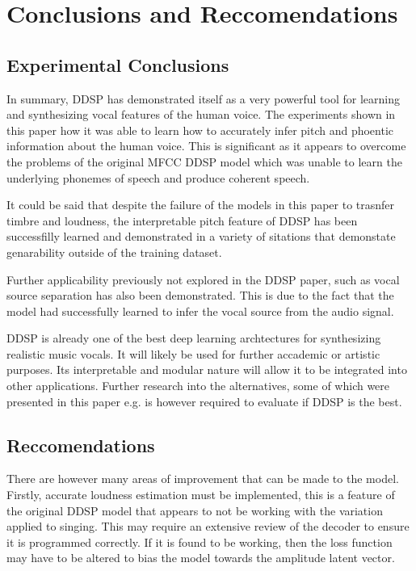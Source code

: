 \chapter{Conclusions and Reccomendations}

\section{Experimental Conclusions}

In summary, DDSP has demonstrated itself as a very powerful tool for learning and synthesizing vocal features of the human voice. The experiments shown in this paper how it was able to learn how to accurately infer pitch and phoentic information about the human voice. This is significant as it appears to overcome the problems of the original MFCC DDSP model\cite{SingingDDSP} which was unable to learn the underlying phonemes of speech and produce coherent speech.

It could be said that despite the failure of the models in this paper to trasnfer timbre and loudness, the interpretable pitch feature of DDSP has been successfilly learned and demonstrated in a variety of sitations that demonstate genarability outside of the training dataset.

Further applicability previously not explored in the DDSP paper, such as vocal source separation has also been demonstrated. This is due to the fact that the model had successfully learned to infer the vocal source from the audio signal.

DDSP is already one of the best deep learning archtectures for synthesizing realistic music vocals. It will likely be used for further accademic or artistic purposes. Its interpretable and modular nature will allow it to be integrated into other applications. Further research into the alternatives, some of which were presented in this paper e.g.  is however required to evaluate if DDSP is the best.

\section{Reccomendations}

There are however many areas of improvement that can be made to the model. Firstly, accurate loudness estimation must be implemented, this is a feature of the original DDSP model\cite{OriginalDDSP} that appears to not be working with the variation applied to singing. This may require an extensive review of the decoder to ensure it is programmed correctly. If it is found to be working, then the loss function may have to be altered to bias the model towards the amplitude latent vector.

